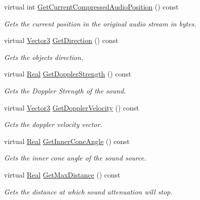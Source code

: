 \begin{DoxyCompactItemize}
virtual int \hyperlink{classMezzanine_1_1Audio_1_1Sound_ad96c91677296147e532a84b53b39b6ee}{GetCurrentCompressedAudioPosition} () const 
\begin{DoxyCompactList}\small\item\em Gets the current position in the original audio stream in bytes. \item\end{DoxyCompactList}\item 
virtual \hyperlink{classMezzanine_1_1Vector3}{Vector3} \hyperlink{classMezzanine_1_1Audio_1_1Sound_a5a1152854f359c18e225511407489512}{GetDirection} () const 
\begin{DoxyCompactList}\small\item\em Gets the objects direction. \item\end{DoxyCompactList}\item 
virtual \hyperlink{namespaceMezzanine_a726731b1a7df72bf3583e4a97282c6f6}{Real} \hyperlink{classMezzanine_1_1Audio_1_1Sound_a3f6d586e0359db750b6976e360842a57}{GetDopplerStrength} () const 
\begin{DoxyCompactList}\small\item\em Gets the Doppler Strength of the sound. \item\end{DoxyCompactList}\item 
virtual \hyperlink{classMezzanine_1_1Vector3}{Vector3} \hyperlink{classMezzanine_1_1Audio_1_1Sound_a472e29b7a9d1f86c92a2a7ba5413ffaf}{GetDopplerVelocity} () const 
\begin{DoxyCompactList}\small\item\em Gets the doppler velocity vector. \item\end{DoxyCompactList}\item 
virtual \hyperlink{namespaceMezzanine_a726731b1a7df72bf3583e4a97282c6f6}{Real} \hyperlink{classMezzanine_1_1Audio_1_1Sound_a2408f6fd02420ee3916306539542f78d}{GetInnerConeAngle} () const 
\begin{DoxyCompactList}\small\item\em Gets the inner cone angle of the sound source. \item\end{DoxyCompactList}\item 
virtual \hyperlink{namespaceMezzanine_a726731b1a7df72bf3583e4a97282c6f6}{Real} \hyperlink{classMezzanine_1_1Audio_1_1Sound_adcf417a8d48223bd828fa58eb0cb8861}{GetMaxDistance} () const 
\begin{DoxyCompactList}\small\item\em Gets the distance at which sound attenuation will stop. \item\end{DoxyCompactList}\item 

\end{DoxyCompactItemize}
